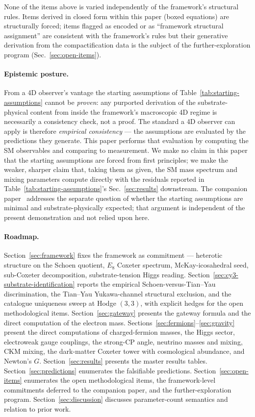 ﻿\documentclass[reprint,amsmath,amssymb,aps,prd,longbibliography,floatfix]{revtex4-2}
\begin{document}
None of the items above is varied independently of the framework's
structural rules. Items derived in closed form within this paper
(boxed equations) are structurally forced; items flagged as encoded
or as ``framework structural assignment'' are consistent with the
framework's rules but their generative derivation from the
compactification data is the subject of the further-exploration
program (Sec.~\ref{sec:open-items}).

\paragraph{Epistemic posture.}
From a 4D observer's vantage the starting assumptions of
Table~\ref{tab:starting-assumptions} cannot be \emph{proven}: any
purported derivation of the substrate-physical content from inside
the framework's macroscopic 4D regime is necessarily a consistency
check, not a proof. The standard a 4D observer can apply is therefore
\emph{empirical consistency} --- the assumptions are evaluated by the
predictions they generate. This paper performs that evaluation by
computing the SM observables and comparing to measurement. We make no
claim in this paper that the starting assumptions are forced from
first principles; we make the weaker, sharper claim that, taking them
as given, the SM mass spectrum and mixing parameters compute directly
with the residuals reported in Table~\ref{tab:starting-assumptions}'s
Sec.~\ref{sec:results} downstream. The companion
paper~\cite{UnreasonableEffectiveness} addresses the separate
question of whether the starting assumptions are minimal and
substrate-physically expected; that argument is independent of the
present demonstration and not relied upon here.

\paragraph{Roadmap.}
Section~\ref{sec:framework} fixes the framework as commitment ---
heterotic structure on the Schoen quotient, $E_8$ Coxeter spectrum,
McKay-icosahedral seed, sub-Coxeter decomposition, substrate-tension
Higgs reading. Section~\ref{sec:cy3-substrate-identification} reports
the empirical Schoen-versus-Tian--Yau discrimination, the Tian--Yau
Yukawa-channel structural exclusion, and the catalogue uniqueness
sweep at Hodge $(3,3)$, with explicit hedges for the open
methodological items. Section~\ref{sec:gateway} presents the gateway
formula and the direct computation of the electron mass.
Sections~\ref{sec:fermions}--\ref{sec:gravity} present the direct
computations of charged-fermion masses, the Higgs sector, electroweak
gauge couplings, the strong-CP angle, neutrino masses and mixing, CKM
mixing, the dark-matter Coxeter tower with cosmological abundance,
and Newton's $G$. Section~\ref{sec:results} presents the master
results tables. Section~\ref{sec:predictions} enumerates the
falsifiable predictions. Section~\ref{sec:open-items} enumerates the
open methodological items, the framework-level commitments deferred
to the companion paper, and the further-exploration program.
Section~\ref{sec:discussion} discusses parameter-count semantics and
relation to prior work.
\end{document}
